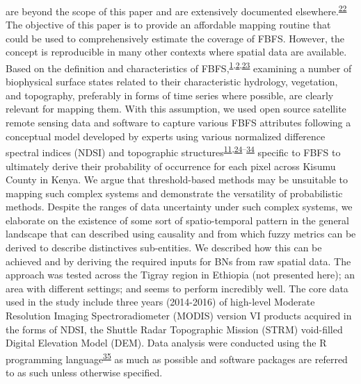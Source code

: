 \documentclass[12pt,oneside]{article}
\begin{document}
are beyond the scope of this paper and are extensively documented
elsewhere.\textsuperscript{\protect\hyperlink{ref-Pourret_et_al_2008}{22}}
The objective of this paper is to provide an affordable mapping routine
that could be used to comprehensively estimate the coverage of FBFS.
However, the concept is reproducible in many other contexts where
spatial data are available. Based on the definition and characteristics
of
FBFS,\textsuperscript{\protect\hyperlink{ref-Puertas_et_al_2011}{1},\protect\hyperlink{ref-VanSteenbergen_et_al_2010}{2},\protect\hyperlink{ref-VanSteenbergen_et_al_2011}{23}}
examining a number of biophysical surface states related to their
characteristic hydrology, vegetation, and topography, preferably in
forms of time series where possible, are clearly relevant for mapping
them. With this assumption, we used open source satellite remote sensing
data and software to capture various FBFS attributes following a
conceptual model developed by experts using various normalized
difference spectral indices (NDSI) and topographic
structures\textsuperscript{\protect\hyperlink{ref-Wegmann_et_al_2016}{11},\protect\hyperlink{ref-Arge_et_al_2003}{24}--\protect\hyperlink{ref-Yang_et_al_2006}{34}}
specific to FBFS to ultimately derive their probability of occurrence
for each pixel across Kisumu County in Kenya. We argue that
threshold-based methods may be unsuitable to mapping such complex
systems and demonstrate the versatility of probabilistic methods.
Despite the ranges of data uncertainty under such complex systems, we
elaborate on the existence of some sort of spatio-temporal pattern in
the general landscape that can described using causality and from which
fuzzy metrics can be derived to describe distinctives sub-entities. We
described how this can be achieved and by deriving the required inputs
for BNs from raw spatial data. The approach was tested across the Tigray
region in Ethiopia (not presented here); an area with different
settings; and seems to perform incredibly well. The core data used in
the study include three years (2014-2016) of high-level Moderate
Resolution Imaging Spectroradiometer (MODIS) version VI products
acquired in the forms of NDSI, the Shuttle Radar Topographic Mission
(STRM) void-filled Digital Elevation Model (DEM). Data analysis were
conducted using the R programming
language\textsuperscript{\protect\hyperlink{ref-RCoreTeam_2018}{35}} as
much as possible and software packages are referred to as such unless
otherwise specified.
\end{document}

